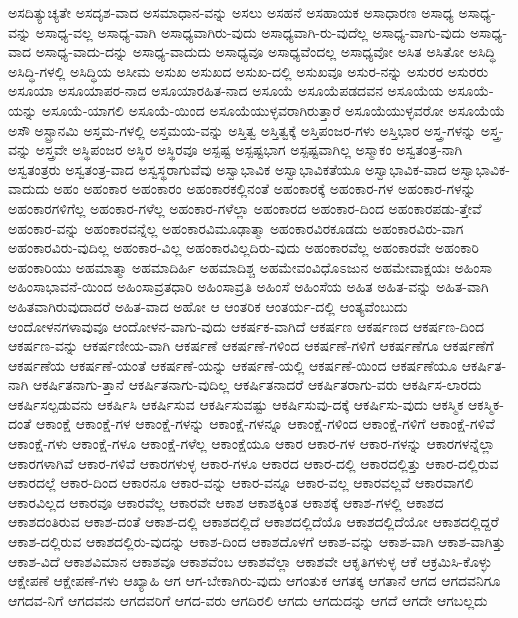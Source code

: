 {ಅಸದಿತ್ಯುಚ್ಯತೇ
ಅಸದೃಶ-ವಾದ
ಅಸಮಾಧಾನ-ವನ್ನು
ಅಸಲು
ಅಸಹನೆ
ಅಸಹಾಯಕ
ಅಸಾಧಾರಣ
ಅಸಾಧ್ಯ
ಅಸಾಧ್ಯ-ವನ್ನು
ಅಸಾಧ್ಯ-ವಲ್ಲ
ಅಸಾಧ್ಯ-ವಾಗಿ
ಅಸಾಧ್ಯವಾಗಿರು-ವುದು
ಅಸಾಧ್ಯವಾಗಿ-ರು-ವುದೆಲ್ಲ
ಅಸಾಧ್ಯ-ವಾಗು-ವುದು
ಅಸಾಧ್ಯ-ವಾದ
ಅಸಾಧ್ಯ-ವಾದು-ದನ್ನು
ಅಸಾಧ್ಯ-ವಾದುದು
ಅಸಾಧ್ಯವೂ
ಅಸಾಧ್ಯವೆಂದಲ್ಲ
ಅಸಾಧ್ಯವೋ
ಅಸಿತ
ಅಸಿತೋ
ಅಸಿದ್ಧಿ
ಅಸಿದ್ಧಿ-ಗಳಲ್ಲಿ
ಅಸಿದ್ಧಿಯ
ಅಸೀಮ
ಅಸುಖ
ಅಸುಖದ
ಅಸುಖ-ದಲ್ಲಿ
ಅಸುಖವೂ
ಅಸುರ-ನನ್ನು
ಅಸುರರ
ಅಸುರರು
ಅಸೂಯಾ
ಅಸೂಯಾಪರ-ನಾದ
ಅಸೂಯಾರಹಿತ-ನಾದ
ಅಸೂಯೆ
ಅಸೂಯೆಪಡದವನ
ಅಸೂಯೆಯ
ಅಸೂಯೆ-ಯನ್ನು
ಅಸೂಯೆ-ಯಾಗಲಿ
ಅಸೂಯೆ-ಯಿಂದ
ಅಸೂಯೆಯುಳ್ಳವರಾಗಿರುತ್ತಾರೆ
ಅಸೂಯೆಯುಳ್ಳವರೋ
ಅಸೂಯೆಯೆ
ಅಸೌ
ಅಸ್ಟ್ರಾನಮಿ
ಅಸ್ತಮ-ಗಳಲ್ಲಿ
ಅಸ್ತಮಯ-ವನ್ನು
ಅಸ್ತಿತ್ವ
ಅಸ್ತಿತ್ವಕ್ಕೆ
ಅಸ್ತಿಪಂಜರ-ಗಳು
ಅಸ್ತಿಭಾರ
ಅಸ್ತ್ರ-ಗಳನ್ನು
ಅಸ್ತ್ರ-ವನ್ನು
ಅಸ್ತ್ರವೇ
ಅಸ್ಥಿಪಂಜರ
ಅಸ್ಥಿರ
ಅಸ್ಥಿರವೂ
ಅಸ್ಪಷ್ಟ
ಅಸ್ಪಷ್ಟಭಾಗ
ಅಸ್ಪಷ್ಟವಾಗಿಲ್ಲ
ಅಸ್ಮಾಕಂ
ಅಸ್ವತಂತ್ರ-ನಾಗಿ
ಅಸ್ವತಂತ್ರರು
ಅಸ್ವತಂತ್ರ-ವಾದ
ಅಸ್ವಸ್ಥರಾಗುವೆವು
ಅಸ್ವಾಭಾವಿಕ
ಅಸ್ವಾಭಾವಿಕತೆಯೂ
ಅಸ್ವಾಭಾವಿಕ-ವಾದ
ಅಸ್ವಾಭಾವಿಕ-ವಾದುದು
ಅಹಂ
ಅಹಂಕಾರ
ಅಹಂಕಾರಂ
ಅಹಂಕಾರಕಲ್ಲಿನಂತೆ
ಅಹಂಕಾರಕ್ಕೆ
ಅಹಂಕಾರ-ಗಳ
ಅಹಂಕಾರ-ಗಳನ್ನು
ಅಹಂಕಾರಗಳಿಗೆಲ್ಲ
ಅಹಂಕಾರ-ಗಳೆಲ್ಲ
ಅಹಂಕಾರ-ಗಳೆಲ್ಲಾ
ಅಹಂಕಾರದ
ಅಹಂಕಾರ-ದಿಂದ
ಅಹಂಕಾರಪಡು-ತ್ತೇವೆ
ಅಹಂಕಾರ-ವನ್ನು
ಅಹಂಕಾರವನ್ನೆಲ್ಲ
ಅಹಂಕಾರವಿಮೂಢಾತ್ಮಾ
ಅಹಂಕಾರವಿರಕೂಡದು
ಅಹಂಕಾರವಿರು-ವಾಗ
ಅಹಂಕಾರವಿರು-ವುದಿಲ್ಲ
ಅಹಂಕಾರ-ವಿಲ್ಲ
ಅಹಂಕಾರವಿಲ್ಲದಿರು-ವುದು
ಅಹಂಕಾರವೆಲ್ಲ
ಅಹಂಕಾರವೇ
ಅಹಂಕಾರಿ
ಅಹಂಕಾರಿಯು
ಅಹಮಾತ್ಮಾ
ಅಹಮಾದಿರ್ಹಿ
ಅಹಮಾದಿಶ್ಚ
ಅಹಮೇವಂವಿಧೊಽಜುನ
ಅಹಮೇವಾಕ್ಷಯಃ
ಅಹಿಂಸಾ
ಅಹಿಂಸಾಭಾವನೆ-ಯಿಂದ
ಅಹಿಂಸಾವ್ರತಧಾರಿ
ಅಹಿಂಸಾವ್ರತಿ
ಅಹಿಂಸೆ
ಅಹಿಂಸೆಯ
ಅಹಿತ
ಅಹಿತ-ವನ್ನು
ಅಹಿತ-ವಾಗಿ
ಅಹಿತವಾಗಿರುವುದಾದರೆ
ಅಹಿತ-ವಾದ
ಅಹೋ
ಆ
ಆಂತರಿಕ
ಆಂತರ್ಯ-ದಲ್ಲಿ
ಆಂತ್ಯವೆಂಬುದು
ಆಂದೋಳನಗಳಾವುವೂ
ಆಂದೋಳನ-ವಾಗು-ವುದು
ಆಕರ್ಷಕ-ವಾಗಿದೆ
ಆಕರ್ಷಣ
ಆಕರ್ಷಣದ
ಆಕರ್ಷಣ-ದಿಂದ
ಆಕರ್ಷಣ-ವನ್ನು
ಆಕರ್ಷಣೀಯ-ವಾಗಿ
ಆಕರ್ಷಣೆ
ಆಕರ್ಷಣೆ-ಗಳಿಂದ
ಆಕರ್ಷಣೆ-ಗಳಿಗೆ
ಆಕರ್ಷಣೆಗೂ
ಆಕರ್ಷಣೆಗೆ
ಆಕರ್ಷಣೆಯ
ಆಕರ್ಷಣೆ-ಯಂತೆ
ಆಕರ್ಷಣೆ-ಯನ್ನು
ಆಕರ್ಷಣೆ-ಯಲ್ಲಿ
ಆಕರ್ಷಣೆ-ಯಿಂದ
ಆಕರ್ಷಣೆಯೂ
ಆಕರ್ಷಿತ-ನಾಗಿ
ಆಕರ್ಷಿತನಾಗು-ತ್ತಾನೆ
ಆಕರ್ಷಿತನಾಗು-ವುದಿಲ್ಲ
ಆಕರ್ಷಿತನಾದರೆ
ಆಕರ್ಷಿತರಾಗು-ವರು
ಆಕರ್ಷಿಸ-ಲಾರದು
ಆಕರ್ಷಿಸಲ್ಪಡುವನು
ಆಕರ್ಷಿಸಿ
ಆಕರ್ಷಿಸುವ
ಆಕರ್ಷಿಸುವಷ್ಟು
ಆಕರ್ಷಿಸುವು-ದಕ್ಕೆ
ಆಕರ್ಷಿಸು-ವುದು
ಆಕಸ್ಮಿಕ
ಆಕಸ್ಮಿಕ-ದಂತೆ
ಆಕಾಂಕ್ಷೆ
ಆಕಾಂಕ್ಷೆ-ಗಳ
ಆಕಾಂಕ್ಷೆ-ಗಳನ್ನು
ಆಕಾಂಕ್ಷೆ-ಗಳನ್ನೂ
ಆಕಾಂಕ್ಷೆ-ಗಳಿಂದ
ಆಕಾಂಕ್ಷೆ-ಗಳಿಗೆ
ಆಕಾಂಕ್ಷೆ-ಗಳಿವೆ
ಆಕಾಂಕ್ಷೆ-ಗಳು
ಆಕಾಂಕ್ಷೆ-ಗಳೂ
ಆಕಾಂಕ್ಷೆ-ಗಳೆಲ್ಲ
ಆಕಾಂಕ್ಷೆಯೂ
ಆಕಾರ
ಆಕಾರ-ಗಳ
ಆಕಾರ-ಗಳನ್ನು
ಆಕಾರಗಳನ್ನೆಲ್ಲಾ
ಆಕಾರಗಳಾಗಿವೆ
ಆಕಾರ-ಗಳಿವೆ
ಆಕಾರಗಳುಳ್ಳ
ಆಕಾರ-ಗಳೂ
ಆಕಾರದ
ಆಕಾರ-ದಲ್ಲಿ
ಆಕಾರದಲ್ಲಿತ್ತು
ಆಕಾರ-ದಲ್ಲಿರುವ
ಆಕಾರದಲ್ಲೆ
ಆಕಾರ-ದಿಂದ
ಆಕಾರನೂ
ಆಕಾರ-ವನ್ನು
ಆಕಾರ-ವನ್ನೂ
ಆಕಾರ-ವಲ್ಲ
ಆಕಾರವಲ್ಲವೆ
ಆಕಾರವಾಗಲಿ
ಆಕಾರವಿಲ್ಲದ
ಆಕಾರವೂ
ಆಕಾರವೆಲ್ಲ
ಆಕಾರವೇ
ಆಕಾಶ
ಆಕಾಶಕ್ಕಿಂತ
ಆಕಾಶಕ್ಕೆ
ಆಕಾಶ-ಗಳಲ್ಲಿ
ಆಕಾಶದ
ಆಕಾಶದಂತಿರುವ
ಆಕಾಶ-ದಂತೆ
ಆಕಾಶ-ದಲ್ಲಿ
ಆಕಾಶದಲ್ಲಿದೆ
ಆಕಾಶದಲ್ಲಿದೆಯೊ
ಆಕಾಶದಲ್ಲಿದೆಯೋ
ಆಕಾಶದಲ್ಲಿದ್ದರೆ
ಆಕಾಶ-ದಲ್ಲಿರುವ
ಆಕಾಶದಲ್ಲಿರು-ವುದನ್ನು
ಆಕಾಶ-ದಿಂದ
ಆಕಾಶದೊಳಗೆ
ಆಕಾಶ-ವನ್ನು
ಆಕಾಶ-ವಾಗಿ
ಆಕಾಶ-ವಾಗಿತ್ತು
ಆಕಾಶ-ವಿದೆ
ಆಕಾಶವಿಮಾನ
ಆಕಾಶವೂ
ಆಕಾಶವೆಂಬ
ಆಕಾಶವೆಲ್ಲಾ
ಆಕಾಶವೇ
ಆಕೃತಿಗಳುಳ್ಳ
ಆಕೆ
ಆಕ್ರಮಿಸಿ-ಕೊಳ್ಳು
ಆಕ್ಷೇಪಣೆ
ಆಕ್ಷೇಪಣೆ-ಗಳು
ಆಖ್ಯಾಹಿ
ಆಗ
ಆಗ-ಬೇಕಾಗಿರು-ವುದು
ಆಗಂತುಕ
ಆಗತಕ್ಕ
ಆಗತಾನೆ
ಆಗದ
ಆಗದವನಿಗೂ
ಆಗದವ-ನಿಗೆ
ಆಗದವನು
ಆಗದವರಿಗೆ
ಆಗದ-ವರು
ಆಗದಿರಲಿ
ಆಗದು
ಆಗದುದನ್ನು
ಆಗದೆ
ಆಗದೇ
ಆಗಬಲ್ಲದು
}
